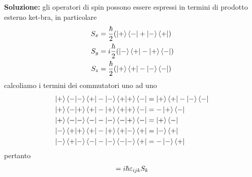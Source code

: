 \documentclass{article}
\begin{document}
\textbf{Soluzione:} gli operatori di spin possono essere espressi in termini di prodotto esterno ket-bra, in particolare
\begin{align}
    S_x &= \frac{\hbar}{2}(\ket{+}\bra{-} + \ket{-}\bra{+}) \notag \\
    S_y &= i\frac{\hbar}{2}(\ket{-}\bra{+} - \ket{+}\bra{-}) \notag \\
    S_z &= \frac{\hbar}{2}(\ket{+}\bra{+} - \ket{-}\bra{-}) \notag
\end{align}
calcoliamo i termini dei commutatori uno ad uno
\begin{align}
    \ket{+}\braket{-|-}\bra{+} - \ket{-}\braket{+|+}\bra{-} &= \ket{+}\bra{+} - \ket{-}\bra{-} \notag \\
    \ket{+}\braket{-|+}\bra{+} - \ket{+}\braket{+|+}\bra{-} &= -\ket{+}\bra{-} \notag \\
    \ket{+}\braket{-|-}\bra{-} - \ket{-}\braket{-|+}\bra{-} &= \ket{+}\bra{-} \notag \\
    \ket{-}\braket{+|+}\bra{+} - \ket{+}\braket{+|-}\bra{+} &= \ket{-}\bra{+} \notag \\
    \ket{-}\braket{+|-}\bra{-} - \ket{-}\braket{-|-}\bra{+} &= -\ket{-}\bra{+} \notag
\end{align}
pertanto
\begin{align}
    [S_i, S_j] = i\hbar\varepsilon_{ijk}S_k \notag
\end{align}
\end{document}
